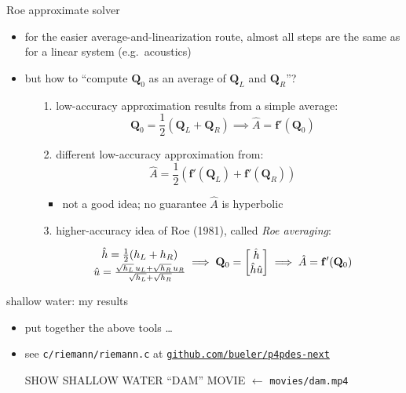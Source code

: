 \documentclass[10pt,dvipsnames,usepdftitle=false,
hyperref={pdftitle = {Finite volume methods},
    pdfauthor = {Ed Bueler}}]{beamer}
\newcommand{\bbf}{\mathbf{f}}
\newcommand{\bQ}{\mathbf{Q}}
\begin{document}
\begin{frame}{Roe approximate solver}

\begin{itemize}
\item for the easier average-and-linearization route, almost all steps are the same as for a linear system (e.g.~acoustics)
\item but how to ``compute $\bQ_0$ as an average of $\bQ_L$ and $\bQ_R$''?
    \begin{itemize}
    \item[1.] low-accuracy approximation results from a simple average:
        $$\bQ_0 = \frac{1}{2} \left(\bQ_L + \bQ_R\right) \implies \hat A = \bbf'(\bQ_0)$$
    \item[2.] different low-accuracy approximation from:
        $$\hat A = \frac{1}{2} \left(\bbf'(\bQ_L) + \bbf'(\bQ_R)\right)$$

        \begin{itemize}
        \item not a good idea; no guarantee $\hat A$ is hyperbolic
        \end{itemize}
    \item[3.] higher-accuracy idea of Roe (1981), called \emph{Roe averaging}:
        $$\begin{matrix} \hat h = \frac{1}{2} (h_L + h_R) {\Large\strut} \\
\hat u = \frac{\sqrt{h_L}\, u_L + \sqrt{h_R}\, u_R}{\sqrt{h_L} + \sqrt{h_R}}
\end{matrix}
\implies \bQ_0 = \begin{bmatrix} \hat h \\ \hat h \hat u \end{bmatrix} \implies \hat A = \bbf'(\bQ_0)$$
    \end{itemize}
\end{itemize}
\end{frame}


\begin{frame}{shallow water: my results}

\begin{itemize}
\item put together the above tools \dots
\item see \texttt{c/riemann/riemann.c} at \href{https://github.com/bueler/p4pdes-next}{\texttt{github.com/bueler/p4pdes-next}}

\vspace{10mm}
\begin{center}
\alert{SHOW SHALLOW WATER ``DAM'' MOVIE}  \qquad $\leftarrow$ \texttt{movies/dam.mp4}
\end{center}
\end{itemize}

\end{frame}
\end{document}
